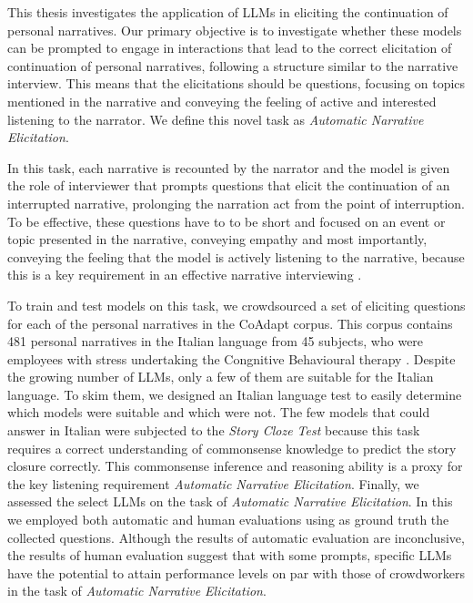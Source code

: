 This thesis investigates the application of LLMs in eliciting the continuation of personal narratives. Our primary objective is to investigate whether these models can be prompted to engage in interactions that lead to the correct elicitation of continuation of personal narratives, following a structure similar to the narrative interview. This means that the elicitations should be questions, focusing on topics mentioned in the narrative and conveying the feeling of active and interested listening to the narrator. We define this novel task as \emph{Automatic Narrative Elicitation}. 

In this task, each narrative is recounted by the narrator and the model is given the role of interviewer that prompts questions that elicit the continuation of an interrupted narrative, prolonging the narration act from the point of interruption. To be effective, these questions have to to be short and focused on an event or topic presented in the narrative, conveying empathy and most importantly, conveying the feeling that the model is actively listening to the narrative, because this is a key requirement in an effective narrative interviewing \cite{Kim2015-es}.

To train and test models on this task, we crowdsourced a set of eliciting questions for each of the personal narratives in the CoAdapt corpus. This corpus contains 481 personal narratives in the Italian language from 45 subjects, who were employees with stress undertaking the Congnitive Behavioural therapy \cite{coadapt}. Despite the growing number of LLMs, only a few of them are suitable for the Italian language. To skim them, we designed an Italian language test to easily determine which models were suitable and which were not. The few models that could answer in Italian were subjected to the \emph{Story Cloze Test} \cite{mostafazadeh2016corpus} because this task requires a correct understanding of commonsense knowledge to predict the story closure correctly. This commonsense inference and reasoning ability is a proxy for the key listening requirement \emph{Automatic Narrative Elicitation}. 
Finally, we assessed the select LLMs on the task of \emph{Automatic Narrative Elicitation}. In this we employed both automatic and human evaluations using as ground truth the collected questions. 
Although the results of automatic evaluation are inconclusive, the results of human evaluation suggest that with some prompts, specific LLMs have the potential to attain performance levels on par with those of crowdworkers in the task of \emph{Automatic Narrative Elicitation}. 


